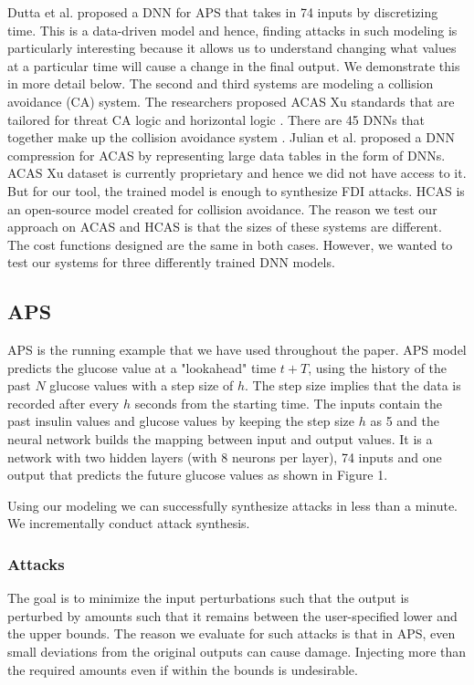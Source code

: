 Dutta et al. \cite{10.1007/978-3-319-99429-1_11} proposed a DNN for APS that takes in 74 inputs by discretizing time. This is a data-driven model and hence, finding attacks in such modeling is particularly interesting because it allows us to understand changing what values at a particular time will cause a change in the final output. We demonstrate this in more detail below. The second and third systems are modeling a collision avoidance (CA) system. The researchers proposed ACAS Xu standards that are tailored for threat CA logic and horizontal logic \cite{7778055}. There are 45 DNNs that together make up the collision avoidance system \cite{Julian_2019}.  Julian et al. proposed a DNN compression for ACAS by representing large data tables in the form of DNNs. ACAS Xu dataset is currently proprietary and hence we did not have access to it. But for our tool, the trained model is enough to synthesize FDI attacks. HCAS is an open-source model created for collision avoidance. The reason we test our approach on ACAS and HCAS is that the sizes of these systems are different. The cost functions designed are the same in both cases. However, we wanted to test our systems for three differently trained DNN models.

\subsection{APS}
APS is the running example that we have used throughout the paper. 
APS model predicts the glucose value at a "lookahead" time $t + T$, using the history of the past $N$ glucose values with a step size of $h$. The step size implies that the data is recorded after every $h$ seconds from the starting time. The inputs contain the past insulin values and glucose values by keeping the step size $h$ as 5 and the neural network builds the mapping between input and output values. It is a network with two hidden layers (with 8 neurons per layer), 74 inputs and one output that predicts the future glucose values as shown in Figure 1. 

Using our modeling we can successfully synthesize attacks in less than a minute.
We incrementally conduct attack synthesis. 
\subsubsection{Attacks}
The goal is to minimize the input perturbations such that the output is perturbed by amounts such that it remains between the user-specified lower and the upper bounds. The reason we evaluate for such attacks is that in APS, even small deviations from the original outputs can cause damage. Injecting more than the required amounts even if within the bounds is undesirable.

